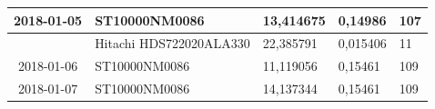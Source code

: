 \documentclass{VUMIFPSkursinis}
\begin{document}
\begin{table}[H]
{\begin{tabular}{|c|l|l|l|l|}
2018-01-05                                      & ST10000NM0086                         & 13,414675                              & 0,14986                              & 107                                  \\ \hline
\cellcolor[HTML]{C0C0C0}                        & Hitachi HDS722020ALA330               & 22,385791                              & 0,015406                             & 11                                   \\ \hline
2018-01-06                                      & ST10000NM0086                         & 11,119056                              & 0,15461                              & 109                                  \\ \hline
2018-01-07                                      & ST10000NM0086                         & 14,137344                              & 0,15461                              & 109                                  \\ \hline
\end{tabular}}
\end{table}
\end{document}
